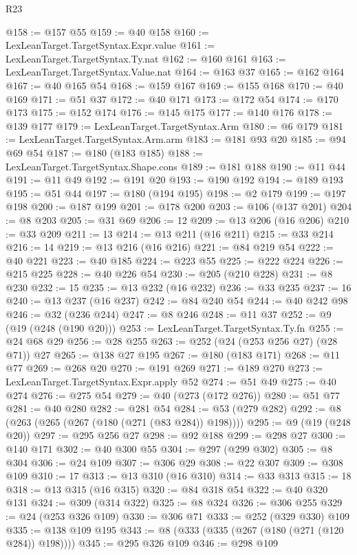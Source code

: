 \begin{lexlean}{R23}
\begin{coremodule}
{{{{{{{{{{{{{{{{{{{{{{{{{{{{{{{{{{{{{{{{{{{{{{{@158 := @157 @55
@159 := @40 @158
@160 := LexLeanTarget.TargetSyntax.Expr.value
@161 := LexLeanTarget.TargetSyntax.Ty.nat
@162 := @160 @161
@163 := LexLeanTarget.TargetSyntax.Value.nat
@164 := @163 @37
@165 := @162 @164
@167 := @40 @165 @54
@168 := @159 @167
@169 := @155 @168
@170 := @40 @169
@171 := @51 @37
@172 := @40 @171
@173 := @172 @54
@174 := @170 @173
@175 := @152 @174
@176 := @145 @175
@177 := @140 @176
@178 := @139 @177
@179 := LexLeanTarget.TargetSyntax.Arm
@180 := @6 @179
@181 := LexLeanTarget.TargetSyntax.Arm.arm
@183 := @181 @93 @20
@185 := @94 @69 @54
@187 := @180 (@183 @185)
@188 := LexLeanTarget.TargetSyntax.Shape.cons
@189 := @181 @188
@190 := @11 @44
@191 := @11 @49
@192 := @191 @20
@193 := @190 @192
@194 := @189 @193
@195 := @51 @44
@197 := @180 (@194 @195)
@198 := @2 @179
@199 := @197 @198
@200 := @187 @199
@201 := @178 @200
@203 := @106 (@137 @201)
@204 := @8 @203
@205 := @31 @69
@206 := 12
@209 := @13 @206 (@16 @206)
@210 := @33 @209
@211 := 13
@214 := @13 @211 (@16 @211)
@215 := @33 @214
@216 := 14
@219 := @13 @216 (@16 @216)
@221 := @84 @219 @54
@222 := @40 @221
@223 := @40 @185
@224 := @223 @55
@225 := @222 @224
@226 := @215 @225
@228 := @40 @226 @54
@230 := @205 (@210 @228)
@231 := @8 @230
@232 := 15
@235 := @13 @232 (@16 @232)
@236 := @33 @235
@237 := 16
@240 := @13 @237 (@16 @237)
@242 := @84 @240 @54
@244 := @40 @242 @98
@246 := @32 (@236 @244)
@247 := @8 @246
@248 := @11 @37
@252 := @9 (@19 (@248 (@190 @20)))
@253 := LexLeanTarget.TargetSyntax.Ty.fn
@255 := @24 @68 @29
@256 := @28 @255
@263 := @252 (@24 (@253 @256 @27) (@28 @71)) @27
@265 := @138 @27 @195
@267 := @180 (@183 @171)
@268 := @11 @77
@269 := @268 @20
@270 := @191 @269
@271 := @189 @270
@273 := LexLeanTarget.TargetSyntax.Expr.apply @52
@274 := @51 @49
@275 := @40 @274
@276 := @275 @54
@279 := @40 (@273 (@172 @276))
@280 := @51 @77
@281 := @40 @280
@282 := @281 @54
@284 := @53 (@279 @282)
@292 := @8 (@263 (@265 (@267 (@180 (@271 (@83 @284)) @198))))
@295 := @9 (@19 (@248 @20))
@297 := @295 @256 @27
@298 := @92 @188
@299 := @298 @27
@300 := @140 @171
@302 := @40 @300 @55
@304 := @297 (@299 @302)
@305 := @8 @304
@306 := @24 @109
@307 := @306 @29
@308 := @22 @307
@309 := @308 @109
@310 := 17
@313 := @13 @310 (@16 @310)
@314 := @33 @313
@315 := 18
@318 := @13 @315 (@16 @315)
@320 := @84 @318 @54
@322 := @40 @320 @131
@324 := @309 (@314 @322)
@325 := @8 @324
@326 := @306 @255
@329 := @24 (@253 @326 @109)
@330 := @306 @71
@333 := @252 (@329 @330) @109
@335 := @138 @109 @195
@343 := @8 (@333 (@335 (@267 (@180 (@271 (@120 @284)) @198))))
@345 := @295 @326 @109
@346 := @298 @109
}}}}}}}}}}}}}}}}}}}}}}}}}}}}}}}}}}}}}}}}}}}}}}}
\end{coremodule}
\end{lexlean}
